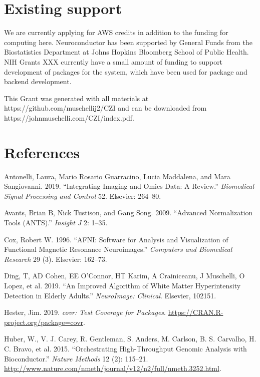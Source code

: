 \documentclass[]{elsarticle} %
\begin{document}
\section{Existing support}\label{existing-support}

We are currently applying for AWS credits in addition to the funding for
computing here. Neuroconductor has been supported by General Funds from
the Biostatistics Department at Johns Hopkins Bloomberg School of Public
Health. NIH Grants XXX currently have a small amount of funding to
support development of packages for the system, which have been used for
package and backend development.

This Grant was generated with all materials at
https://github.com/muschellij2/CZI and can be downloaded from
https://johnmuschelli.com/CZI/index.pdf.

\section*{References}\label{references}

\hypertarget{refs}{}
\hypertarget{ref-antonelli2019integrating}{}
Antonelli, Laura, Mario Rosario Guarracino, Lucia Maddalena, and Mara
Sangiovanni. 2019. ``Integrating Imaging and Omics Data: A Review.''
\emph{Biomedical Signal Processing and Control} 52. Elsevier: 264--80.

\hypertarget{ref-avants2009advanced}{}
Avants, Brian B, Nick Tustison, and Gang Song. 2009. ``Advanced
Normalization Tools (ANTS).'' \emph{Insight J} 2: 1--35.

\hypertarget{ref-afni}{}
Cox, Robert W. 1996. ``AFNI: Software for Analysis and Visualization of
Functional Magnetic Resonance Neuroimages.'' \emph{Computers and
Biomedical Research} 29 (3). Elsevier: 162--73.

\hypertarget{ref-ding2019improved}{}
Ding, T, AD Cohen, EE O'Connor, HT Karim, A Crainiceanu, J Muschelli, O
Lopez, et al. 2019. ``An Improved Algorithm of White Matter
Hyperintensity Detection in Elderly Adults.'' \emph{NeuroImage:
Clinical}. Elsevier, 102151.

\hypertarget{ref-covr}{}
Hester, Jim. 2019. \emph{covr: Test Coverage for Packages}.
\url{https://CRAN.R-project.org/package=covr}.

\hypertarget{ref-bioconductor}{}
Huber, W., V. J. Carey, R. Gentleman, S. Anders, M. Carlson, B. S.
Carvalho, H. C. Bravo, et al. 2015. ``Orchestrating High-Throughput
Genomic Analysis with Bioconductor.'' \emph{Nature Methods} 12 (2):
115--21.
\url{http://www.nature.com/nmeth/journal/v12/n2/full/nmeth.3252.html}.
\end{document}
